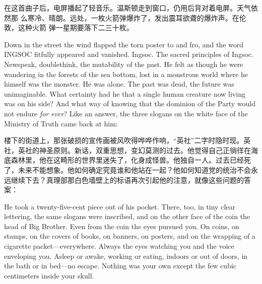 \begin{paracol}{2}
在这首曲子后，电屏播起了轻音乐。温斯顿走到窗口，仍用后背对着电屏。天气依然那
么寒冷、晴朗。远处，一枚火箭弹爆炸了，发出震耳欲聋的爆炸声。在伦敦，这种火箭
弹一星期要落下二三十枚。

\switchcolumn*

Down in the street the wind flapped the torn poster to and fro, and the
word INGSOC fitfully appeared and vanished. Ingsoc. The sacred
principles of Ingsoc. Newspeak, doublethink, the mutability of the past.
He felt as though he were wandering in the forests of the sea bottom,
lost in a monstrous world where he himself was the monster. He was
alone. The past was dead, the future was unimaginable. What certainty
had he that a single human creature now living was on his side? And what
way of knowing that the dominion of the Party would not endure \emph{for
ever}? Like an answer, the three slogans on the white face of the
Ministry of Truth came back at him:

\switchcolumn

楼下的街道上，那张破损的宣传画被风吹得哗哗作响，``英社''二字时隐时现。英社，英社的神圣原则。新话，双重思想，变幻莫测的过去。他觉得自己正徜徉在海底森林里，他在这畸形的世界里迷失了，化身成怪兽。他独自一人。过去已经死了，未来不能想象。他如何确定究竟谁和他站在一起？他如何知道党的统治不会永远继续下去？真理部那白色墙壁上的标语再次引起他的注意，就像这些问题的答案：

\switchcolumn*


\switchcolumn


\switchcolumn*

He took a twenty-five-cent piece out of his pocket. There, too, in tiny
clear lettering, the same slogans were inscribed, and on the other face
of the coin the head of Big Brother. Even from the coin the eyes pursued
you. On coins, on stamps, on the covers of books, on banners, on
posters, and on the wrapping of a cigarette packet---everywhere. Always
the eyes watching you and the voice enveloping you. Asleep or awake,
working or eating, indoors or out of doors, in the bath or in bed---no
escape. Nothing was your own except the few cubic centimeters inside
your skull.

\switchcolumn


\end{paracol}
